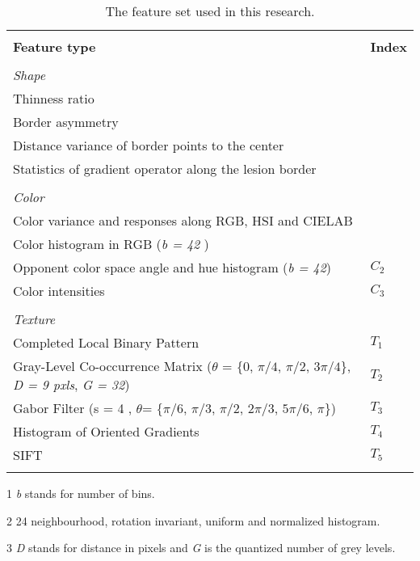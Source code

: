 \begin{table}
	\footnotesize
	\caption[Extracted Features in our proposed framework]{The feature set used in this research.}
	\begin{center}
    \small
	\begin{threeparttable}
	\begin{tabular}{p{} >{\centering\arraybackslash}m{}}
	\hline \\ [-1.5ex]
	 \textbf{Feature type} & \textbf{Index} \\
	\hline \\ [-1.5ex]
	 \multicolumn{2}{l}{\textit{Shape}} \\
     \quad Thinness ratio & \multirow{4}{*}{$S$} \\
	 \quad Border asymmetry & \\
	 \quad Distance variance of border points to the center \cite{tasoulis2010skin} & \\
     \quad Statistics of gradient operator along the lesion border \cite{tasoulis2010skin} & \\ \\    
    \multicolumn{2}{l}{\textit{Color}} \\
     \quad Color variance and responses along RGB, HSI and CIELAB & \multirow{2}{*}{$C_{1}$}\\
     \quad Color histogram in RGB (\textit{b = 42} )\tnote{1} & \\
     \quad Opponent color space angle and hue histogram (\textit{b = 42}) & $C_{2}$\\ 
     \quad Color intensities & $C_{3}$\\ \\
    \multicolumn{2}{l}{\textit{Texture}} \\
	\quad Completed Local Binary Pattern\tnote{2}& $T_{1}$\\
	\quad Gray-Level Co-occurrence Matrix ($\theta$ = \{$0$, $\pi/4$, $\pi/2$, $3\pi/4$\}, \textit{D = 9 pxls}, \textit{G = 32})\tnote{3} & $T_{2}$ \\
    \quad Gabor Filter (s = 4 , $\theta$= \{$\pi/6$, $\pi/3$, $\pi/2$, $2\pi/3$, $5\pi/6$, $\pi$\}) & $T_{3}$ \\
    \quad Histogram of Oriented Gradients & $T_{4}$\\
    \quad SIFT & $T_{5}$\\ \\ [-1.5ex]
    \hline
  \end{tabular}
  \scriptsize{
  \begin{tablenotes}
  \item[1] \textit{b} stands for number of bins.
  \item[2] 24 neighbourhood, rotation invariant, uniform and normalized histogram.
  \item[3] \textit{D} stands for distance in pixels and \textit{G} is the quantized number of grey levels.
  \end{tablenotes}
  }
  \end{threeparttable}
\end{center}
\label{Tab:Table2}
\end{table}

